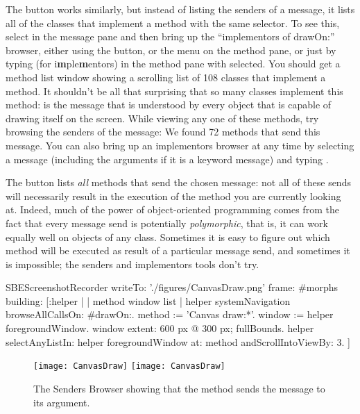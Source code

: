 \documentclass[a4paper,10pt,twoside]{book}
\begin{document}
The  button works similarly, but instead of listing the senders of a message, it lists all of the classes that implement a method with the same selector.
To see this, select  in the message pane and then bring up the ``implementors of drawOn:'' browser, either using the  button, or the  menu on the method pane, or just by typing  (for {i\textbf{m}ple\textbf{m}entors}) in the method pane with  selected.
You should get a method list window showing a scrolling list of 108 classes that implement a  method.
It shouldn't be all that surprising that so many classes implement this method:
 is the message that is understood by every object that is capable of drawing itself on the screen.
While viewing any one of these methods, try browsing the senders of the  message:
We found 72 methods that send this message.
You can also bring up an implementors browser at any time by selecting a message (including the arguments if it is a keyword message) and typing .

The  button lists \emph{all} methods that send the chosen message: not all of these sends will necessarily result in the execution of the method you are currently looking at.
Indeed, much of the power of object-oriented programming comes from the fact that every message send is potentially \emph{polymorphic}, that is, it can work equally well on objects of any class.  Sometimes it is easy to figure out which method will be executed as result of a particular message send, and sometimes it is impossible; the senders and implementors tools don't try.

\begin{ExecuteSmalltalkScript}
SBEScreenshotRecorder writeTo: './figures/CanvasDraw.png' frame: #morphs building: [:helper |
	| method window list |
	helper systemNavigation browseAllCallsOn: #drawOn:.
	method := 'Canvas draw:*'.
	window := helper foregroundWindow.
	window extent: 600 px @ 300 px; fullBounds.
	helper selectAnyListIn: helper foregroundWindow at: method andScrollIntoViewBy: 3.
]
\end{ExecuteSmalltalkScript}
\begin{figure}[htbp]
	\begin{center}
   \ifluluelse
		{\texttt{[image: CanvasDraw]}}
		{\texttt{[image: CanvasDraw]}}
	\end{center}
	\caption{The Senders Browser showing that the  method sends the  message to its argument.	\label{fig:CanvasDraw}}
\end{figure}
\end{document}
